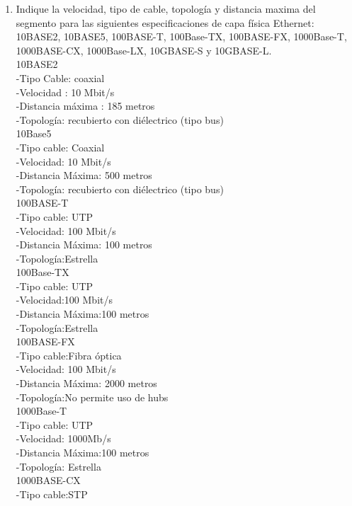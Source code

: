 \documentclass{udparticle}
\begin{document}
\begin{enumerate}
\item Indique la velocidad, tipo de cable, topología y distancia maxima del segmento para las 
siguientes especificaciones de capa física Ethernet: 10BASE2, 10BASE5, 100BASE-T, 100Base-TX,
100BASE-FX, 1000Base-T, 1000BASE-CX, 1000Base-LX, 10GBASE-S y 10GBASE-L.\\
    10BASE2\\ 
        -Tipo Cable: coaxial\\
        -Velocidad : 10 Mbit/s\\
        -Distancia máxima : 185 metros\\
        -Topología: recubierto con diélectrico (tipo bus)\\
    10Base5\\
        -Tipo cable: Coaxial\\
        -Velocidad: 10 Mbit/s\\
        -Distancia Máxima: 500 metros\\
        -Topología: recubierto con diélectrico (tipo bus)\\
    100BASE-T\\
        -Tipo cable: UTP\\
        -Velocidad: 100 Mbit/s\\
        -Distancia Máxima: 100 metros\\
        -Topología:Estrella\\
    100Base-TX\\
        -Tipo cable: UTP\\
        -Velocidad:100 Mbit/s\\
        -Distancia Máxima:100 metros\\
        -Topología:Estrella\\
    100BASE-FX\\
        -Tipo cable:Fibra óptica\\
        -Velocidad: 100 Mbit/s\\
        -Distancia Máxima: 2000 metros\\
        -Topología:No permite uso de hubs\\
    1000Base-T\\
        -Tipo cable: UTP\\
        -Velocidad: 1000Mb/s\\
        -Distancia Máxima:100 metros\\
        -Topología: Estrella\\
    1000BASE-CX\\
        -Tipo cable:STP\\

\end{enumerate}
\end{document}
